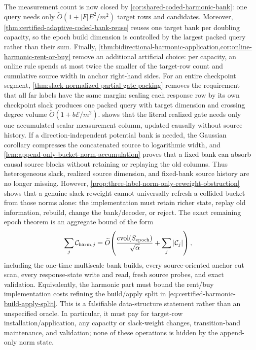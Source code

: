 The measurement count is now closed by
\cref{cor:shared-coded-harmonic-bank}: one query needs only
$\widetilde O(1+|F|E^2/m^2)$ target rows and candidates.  Moreover,
\cref{thm:certified-adaptive-coded-bank-reuse} reuses one target bank per
doubling capacity, so the epoch build dimension is controlled by the largest
packed query rather than their sum.  Finally,
\cref{thm:bidirectional-harmonic-application,cor:online-harmonic-rent-or-buy}
remove an additional artificial choice: per capacity, an online rule spends
at most twice the smaller of the target-row count and cumulative source width
in anchor right-hand sides.  For an entire checkpoint segment,
\cref{thm:slack-normalized-partial-gate-packing} removes the requirement that
all far labels have the same margin: scaling each response row by its own
checkpoint slack produces one packed query with target dimension and crossing
degree volume $\widetilde O(1+b\mathcal E/m^2)$.
 shows that the literal realized
gate needs only one accumulated scalar measurement column, updated causally
without source history.  If a direction-independent potential bank is needed,
the Gaussian corollary compresses the concatenated source to logarithmic
width, and
\cref{lem:append-only-bucket-norm-accumulation} proves that a fixed bank can
absorb causal source blocks without retaining or replaying the old columns.
Thus heterogeneous slack, realized source dimension, and fixed-bank source
history are no longer missing.  However,
\cref{prop:three-label-norm-only-reweight-obstruction} shows that a genuine
slack reweight cannot universally refresh a collided bucket from those norms
alone: the implementation must retain richer state, replay old information,
rebuild, change the bank/decoder, or reject.  The exact remaining epoch theorem is
an aggregate bound of the form
\begin{equation}
 \sum_j\mathcal C_{{\rm harm},j}
 =\widetilde O\!\left(
   \frac{\operatorname{cvol}(S_{\rm epoch})}{\sqrt\alpha}
   +\sum_j|\mathcal C_j|
  \right),
 \label{eq:desired-epoch-harmonic-charge}
\end{equation}
including the one-time multiscale bank builds, every source-oriented anchor
cut scan, every response-state write and read, fresh source probes, and exact
validation.  Equivalently, the harmonic part must bound the rent/buy
implementation costs refining the build/apply split in
\cref{eq:certified-harmonic-build-apply-split}.  This is a falsifiable
data-structure statement rather than an unspecified oracle.  In particular,
it must pay for target-row installation/application, any capacity or
slack-weight changes, transition-band maintenance, and validation; none of
these operations is hidden by the append-only norm state.

